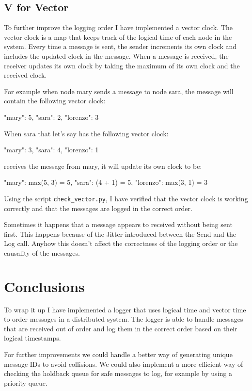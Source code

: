 \documentclass[a4paper, 11pt]{article}
\begin{document}
\subsection{V for Vector}
To further improve the logging order I have implemented a vector clock. The vector clock is a map that keeps track of the logical time of each node in the system. Every time a message is sent, the sender increments its own clock and includes the updated clock in the message. When a message is received, the receiver updates its own clock by taking the maximum of its own clock and the received clock.

For example when node mary sends a message to node sara, the message will contain the following vector clock:
\begin{mylisting}
{"mary": 5, "sara": 2, "lorenzo": 3}
\end{mylisting}

When sara that let's say has the following vector clock:
\begin{mylisting}
{"mary": 3, "sara": 4, "lorenzo": 1}
\end{mylisting}
receives the message from mary, it will update its own clock to be:
\begin{mylisting}
{"mary": max(5, 3) = 5, "sara": (4 + 1) = 5, "lorenzo": max(3, 1) = 3}
\end{mylisting}

Using the script \texttt{check\_vector.py}, I have verified that the vector clock is working correctly and that the messages are logged in the correct order.

Sometimes it happens that a message appears to received without being sent first. This happens because of the Jitter introduced between the Send and the Log call. Anyhow this doesn't affect the correctness of the logging order or the causality of the messages.

\section{Conclusions}

To wrap it up I have implemented a logger that uses logical time and vector time to order messages in a distributed system. The logger is able to handle messages that are received out of order and log them in the correct order based on their logical timestamps.

For further improvements we could handle a better way of generating unique message IDs to avoid collisions. We could also implement a more efficient way of checking the holdback queue for safe messages to log, for example by using a priority queue.
\end{document}

